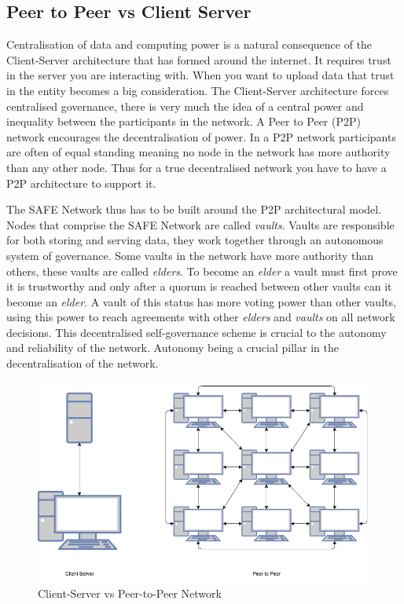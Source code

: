 \subsection{Peer to Peer vs Client Server}

Centralisation of data and computing power is a natural consequence of the Client-Server architecture that has formed around the internet. It requires trust in the server you are interacting with. When you want to upload data that trust in the entity becomes a big consideration. The Client-Server architecture forces centralised governance, there is very much the idea of a central power and inequality between the participants in the network. A Peer to Peer (P2P) network encourages the decentralisation of power. In a P2P network participants are often of equal standing meaning no node in the network has more authority than any other node. Thus for a true decentralised network you have to have a P2P architecture to support it. 

The SAFE Network thus has to be built around the P2P architectural model. Nodes that comprise the SAFE Network are called \textit{vaults}. Vaults are responsible for both storing and serving data, they work together through an autonomous system of governance. Some vaults in the network have more authority than others,  these vaults are called \textit{elders}. To become an \textit{elder} a vault must first prove it is trustworthy and only after a quorum is reached between other vaults can it become an \textit{elder}. A vault of this status has more voting power than other vaults, using this power to reach agreements with other \textit{elders} and \textit{vaults} on all network decisions. This decentralised self-governance scheme is crucial to the autonomy and reliability of the network. Autonomy being a crucial pillar in the decentralisation of the network.

\begin{figure}
	\begin{center}
		\includegraphics[width=\textwidth]{diagrams/client-server-vs-p2p}
		\caption{Client-Server vs Peer-to-Peer Network}
		\label{fig:client-server-peer2peer}
	\end{center}
\end{figure}

